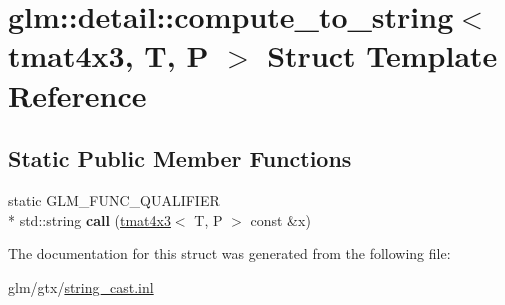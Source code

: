 \hypertarget{structglm_1_1detail_1_1compute__to__string_3_01tmat4x3_00_01T_00_01P_01_4}{\section{glm\-:\-:detail\-:\-:compute\-\_\-to\-\_\-string$<$ tmat4x3, T, P $>$ Struct Template Reference}
\label{structglm_1_1detail_1_1compute__to__string_3_01tmat4x3_00_01T_00_01P_01_4}
}
\subsection*{Static Public Member Functions}
\begin{DoxyCompactItemize}
\item 
\hypertarget{structglm_1_1detail_1_1compute__to__string_3_01tmat4x3_00_01T_00_01P_01_4_a03c7f8dad22b2fbd9a5f90593cffc1a1}{static G\-L\-M\-\_\-\-F\-U\-N\-C\-\_\-\-Q\-U\-A\-L\-I\-F\-I\-E\-R \\*
std\-::string {\bfseries call} (\hyperlink{structglm_1_1tmat4x3}{tmat4x3}$<$ T, P $>$ const \&x)}\label{structglm_1_1detail_1_1compute__to__string_3_01tmat4x3_00_01T_00_01P_01_4_a03c7f8dad22b2fbd9a5f90593cffc1a1}

\end{DoxyCompactItemize}


The documentation for this struct was generated from the following file\-:\begin{DoxyCompactItemize}
\item 
glm/gtx/\hyperlink{string__cast_8inl}{string\-\_\-cast.\-inl}\end{DoxyCompactItemize}

